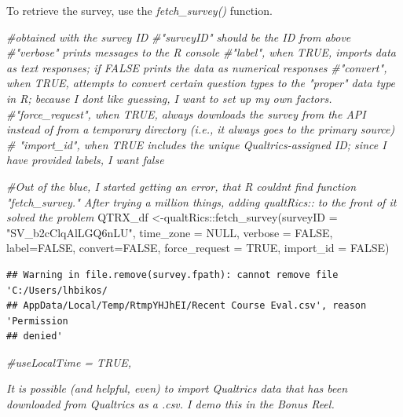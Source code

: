 \documentclass[
  11pt,
]{book}
\newenvironment{Shaded}{\begin{snugshade}}{\end{snugshade}}
\newcommand{\AttributeTok}[1]{\textcolor[rgb]{0.77,0.63,0.00}{#1}}
\newcommand{\CommentTok}[1]{\textcolor[rgb]{0.56,0.35,0.01}{\textit{#1}}}
\newcommand{\ConstantTok}[1]{\textcolor[rgb]{0.00,0.00,0.00}{#1}}
\newcommand{\FunctionTok}[1]{\textcolor[rgb]{0.00,0.00,0.00}{#1}}
\newcommand{\NormalTok}[1]{#1}
\newcommand{\OtherTok}[1]{\textcolor[rgb]{0.56,0.35,0.01}{#1}}
\newcommand{\SpecialCharTok}[1]{\textcolor[rgb]{0.00,0.00,0.00}{#1}}
\newcommand{\StringTok}[1]{\textcolor[rgb]{0.31,0.60,0.02}{#1}}
\begin{document}
To retrieve the survey, use the \emph{fetch\_survey()} function.

\begin{Shaded}
\begin{Highlighting}[]
\CommentTok{\#obtained with the survey ID }
\CommentTok{\#"surveyID" should be the ID from above}
\CommentTok{\#"verbose" prints messages to the R console}
\CommentTok{\#"label", when TRUE, imports data as text responses; if FALSE prints the data as numerical responses}
\CommentTok{\#"convert", when TRUE, attempts to convert certain question types to the "proper" data type in R; because I don\textquotesingle{}t like guessing, I want to set up my own factors.}
\CommentTok{\#"force\_request", when TRUE, always downloads the survey from the API instead of from a temporary directory (i.e., it always goes to the primary source)}
\CommentTok{\# "import\_id", when TRUE includes the unique Qualtrics{-}assigned ID; since I have provided labels, I want false}

\CommentTok{\#Out of the blue, I started getting an error, that R couldn\textquotesingle{}t find function "fetch\_survey."  After trying a million things, adding qualtRics:: to the front of it solved the problem}
\NormalTok{QTRX\_df }\OtherTok{\textless{}{-}}\NormalTok{qualtRics}\SpecialCharTok{::}\FunctionTok{fetch\_survey}\NormalTok{(}\AttributeTok{surveyID =} \StringTok{"SV\_b2cClqAlLGQ6nLU"}\NormalTok{, }\AttributeTok{time\_zone =} \ConstantTok{NULL}\NormalTok{, }\AttributeTok{verbose =} \ConstantTok{FALSE}\NormalTok{, }\AttributeTok{label=}\ConstantTok{FALSE}\NormalTok{, }\AttributeTok{convert=}\ConstantTok{FALSE}\NormalTok{, }\AttributeTok{force\_request =} \ConstantTok{TRUE}\NormalTok{, }\AttributeTok{import\_id =} \ConstantTok{FALSE}\NormalTok{)}
\end{Highlighting}
\end{Shaded}

\begin{verbatim}
## Warning in file.remove(survey.fpath): cannot remove file 'C:/Users/lhbikos/
## AppData/Local/Temp/RtmpYHJhEI/Recent Course Eval.csv', reason 'Permission
## denied'
\end{verbatim}

\begin{Shaded}
\begin{Highlighting}[]
\CommentTok{\#useLocalTime = TRUE,}
\end{Highlighting}
\end{Shaded}

\emph{It is possible (and helpful, even) to import Qualtrics data that has been downloaded from Qualtrics as a .csv. I demo this in the Bonus Reel.}
\end{document}

